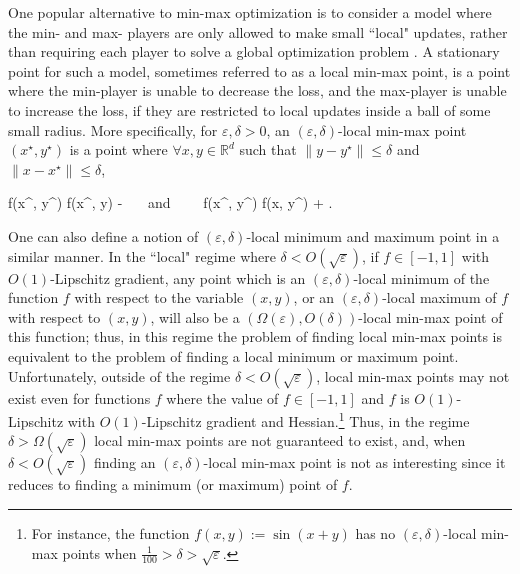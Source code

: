 \documentclass[11pt,letterpaper]{article}
\renewcommand{\epsilon}{\varepsilon}
\newcommand{\coloneqq}{:=}
\def \be{\begin{equs}}
\def \ee{\end{equs}}
\begin{document}
  One popular alternative to min-max optimization  is to consider a model where the min- and max- players are only allowed to make small ``local" updates, rather than requiring each player to solve a global optimization problem \cite{heusel2017gans,daskalakis2018limit,adolphs2018local,daskalakis2020complexity}.
 A stationary point for such a model, sometimes referred to as a local min-max point, is a point where the min-player is unable to decrease the loss, and the max-player is unable to increase the loss, if they are restricted to local updates inside a ball of some small radius. 
 More specifically, for $\epsilon, \delta>0$, an $(\epsilon, \delta)$-local min-max point $(x^\star, y^\star)$ is a point where $ \forall x,y \in \mathbb{R}^d$ such that  $\|y - y^\star\| \leq \delta$  and $\|x - x^\star\| \leq \delta$,
\be
  f(x^\star, y^\star) \geq f(x^\star, y) - \epsilon \ \ \  \mbox{and}  \ \ \ 
 \ f(x^\star, y^\star) \leq f(x, y^\star) + \epsilon.
\ee
%
One can also define a notion of $(\epsilon, \delta)$-local minimum and maximum point in a similar manner.
%
 In the ``local" regime where $\delta < O(\sqrt{\epsilon})$, if $f \in [-1,1]$ with $O(1)$-Lipschitz gradient,  any point which is an $(\epsilon,\delta)$-local minimum of the function $f$ with respect to the variable $(x,y)$, or an $(\epsilon, \delta)$-local maximum of $f$ with respect to $(x,y)$, will also be a $(\Omega(\epsilon), O(\delta))$-local min-max point of this function; thus, in this regime the problem of finding local min-max points is equivalent  to the problem of finding a local minimum or maximum point.
%
%
Unfortunately, outside of the regime $\delta < O(\sqrt{\epsilon})$, local min-max points may not exist even for functions $f$ where the value of $f \in [-1,1]$ and $f$ is $O(1)$-Lipschitz with $O(1)$-Lipschitz gradient and Hessian.\footnote{For instance, the function $f(x,y) \coloneqq \sin(x+y)$ has no $(\epsilon, \delta)$-local min-max points when $\frac{1}{100} > \delta > \sqrt{\epsilon}$.}
%
Thus, in the regime  $\delta > \Omega(\sqrt{\epsilon})$ local min-max points are not guaranteed to exist, and, when $\delta < O(\sqrt{\epsilon})$ 
%
 finding an $(\epsilon, \delta)$-local min-max point is not as interesting since it reduces to finding a minimum (or maximum) point of $f$.




%
\end{document}
